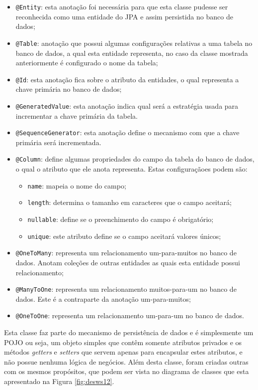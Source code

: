 	\begin{itemize}
	  \item \texttt{@Entity}: esta anotação foi necessária para que esta classe
	  pudesse ser reconhecida como uma entidade do JPA e assim persistida no banco
	  de dados;
	  \item \texttt{@Table}: anotação que possui algumas configurações relativas a
	  uma tabela no banco de dados, a qual esta entidade representa, no caso da
	  classe mostrada anteriormente é configurado o nome da tabela;
	  \item \texttt{@Id}: esta anotação fica sobre o atributo da entidades, o qual
	  representa a chave primária no banco de dados;
	  \item \texttt{@GeneratedValue}: esta anotação indica qual será a estratégia
	  usada para incrementar a chave primária da tabela.
	  \item \texttt{@SequenceGenerator}: esta anotação define o mecanismo com que
	  a chave primária será incrementada.
	  \item \texttt{@Column}: define algumas propriedades do campo da tabela do
	  banco de dados, o qual o atributo que ele anota representa. Estas
	  configuraçãoes podem são:
		  	\begin{itemize}
		    	\item \texttt{name}: mapeia o nome do campo;
		    	\item \texttt{length}: determina o tamanho em caracteres que o campo
		    	aceitará;
		    	\item \texttt{nullable}: define se o preenchimento do campo é obrigatório;
		    	\item \texttt{unique}: este atributo define se o campo aceitará valores
		    	únicos;
		    \end{itemize}
	  \item \texttt{@OneToMany}: representa um relacionamento um-para-muitos no
	  banco de dados. Anotam coleções de outras entidades as quais esta entidade
	  possui relacionamento;
	  \item \texttt{@ManyToOne}: representa um relacionamento
	  muitos-para-um no banco de dados. Este é a contraparte da anotação
	  um-para-muitos;
	  \item \texttt{@OneToOne}: representa um relacionamento um-para-um no banco de
	  dados.
\end{itemize}
 
	\par Esta classe faz parte do mecanismo de persistência de dados e é
simplesmente um  POJO ou seja, um objeto  simples que contêm somente atributos
privados e os métodos \textit{getters} e \textit{setters} que servem apenas
para encapsular estes atributos, e não possue nenhuma lógica de negócios. Além
desta classe, foram criadas outras com os mesmos propósitos, que podem ser
vista no diagrama de classes que esta apresentado na Figura \ref{fig:desws12}.
	
